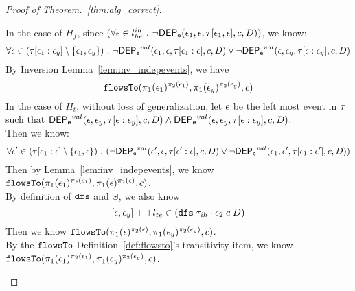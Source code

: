 \begin{proof}[Proof of Theorem.~\ref{thm:alg_correct}]
\begin{case}
\begin{subcase}
\begin{subsubcase}
\begin{subproof}
  In the case of $H_f$, since $(\forall \mathtt{\epsilon} \in l^{ih}_{he} ~.~ \neg \mathsf{DEP_{\mathtt{e}}}(\mathtt{\epsilon}_1, \mathtt{\epsilon}, \mathtt{\tau}[\mathtt{\epsilon}_1, \mathtt{\epsilon}], c, D))$,
  we know:
  \[
      \forall \mathtt{\epsilon} \in (\mathtt{\tau}[\mathtt{\epsilon}_1:\mathtt{\epsilon}_y]\setminus \{\mathtt{\epsilon}_1, \mathtt{\epsilon}_y\}) ~.~
      \neg \mathsf{DEP_{\mathtt{e}}}^{val} (\mathtt{\epsilon}_1, \mathtt{\epsilon}, \mathtt{\tau}[\mathtt{\epsilon}_1: \mathtt{\epsilon}], c, D) 
      \lor \neg \mathsf{DEP_{\mathtt{e}}}^{val} (\mathtt{\epsilon}, \mathtt{\epsilon}_y,\mathtt{\tau}[\mathtt{\epsilon}:\mathtt{\epsilon}_y], c, D)
    \]
    By Inversion Lemma~\ref{lem:inv_indepevents}, we have
    \[
      \mathtt{flowsTo}(\pi_1(\mathtt{\epsilon}_1)^{\pi_2(\mathtt{\epsilon}_1)}, \pi_1(\mathtt{\epsilon}_y)^{\pi_2(\mathtt{\epsilon}_y)}, c)
    \]
  In the case of $H_t$, without loss of generalization, let $\mathtt{\epsilon}$ be the left most event in $\mathtt{\tau}$ such that 
  $\mathsf{DEP_{\mathtt{e}}}^{val} (\mathtt{\epsilon}, \mathtt{\epsilon}_y, \mathtt{\tau}[\mathtt{\epsilon}:\mathtt{\epsilon}_y], c, D) \land \mathsf{DEP_{\mathtt{e}}}^{val} (\mathtt{\epsilon}, \mathtt{\epsilon}_y, \mathtt{\tau}[\mathtt{\epsilon}:\mathtt{\epsilon}_y], c, D)$.
  \\
 Then we know:
  \[
    \forall \mathtt{\epsilon}' \in (\mathtt{\tau}[\mathtt{\epsilon}_1:\mathtt{\epsilon}]\setminus \{\mathtt{\epsilon}_1, \mathtt{\epsilon}\}) 
    ~.~ 
    (\neg \mathsf{DEP_{\mathtt{e}}}^{val} (\mathtt{\epsilon}', \mathtt{\epsilon}, \mathtt{\tau}[\mathtt{\epsilon}':\mathtt{\epsilon}], c, D)
    \lor 
    \neg \mathsf{DEP_{\mathtt{e}}}^{val} (\mathtt{\epsilon}_1, \mathtt{\epsilon}', \mathtt{\tau}[\mathtt{\epsilon}_1: \mathtt{\epsilon}'], c, D))
  \]
Then by Lemma~\ref{lem:inv_indepevents}, we know  $\mathtt{flowsTo}(\pi_1(\mathtt{\epsilon}_1)^{\pi_2(\mathtt{\epsilon}_1)}, \pi_1(\mathtt{\epsilon})^{\pi_2(\mathtt{\epsilon})}, c)$.
\\
  By definition of $\mathtt{dfs}$ and $\uplus$, we also know 
  \[ 
    [\mathtt{\epsilon}, \mathtt{\epsilon}_y] ++ l_{te} \in (\mathtt{dfs} \; {\mathtt{\tau}_{ih} \cdot \mathtt{\epsilon}_2} \; c \; D )
  \]
  Then we know $\mathtt{flowsTo}(\pi_1(\mathtt{\epsilon})^{\pi_2(\mathtt{\epsilon})}, \pi_1(\mathtt{\epsilon}_y)^{\pi_2(\mathtt{\epsilon}_y)}, c)$.
%
\\
By the $\mathtt{flowsTo}$ Definition~\ref{def:flowsto}'s transitivity item, we know $\mathtt{flowsTo}(\pi_1(\mathtt{\epsilon}_1)^{\pi_2(\mathtt{\epsilon}_1)}, \pi_1(\mathtt{\epsilon}_y)^{\pi_2(\mathtt{\epsilon}_y)}, c)$.


\end{subproof}
\end{subsubcase}
\end{subcase}
\end{case}
\end{proof}
